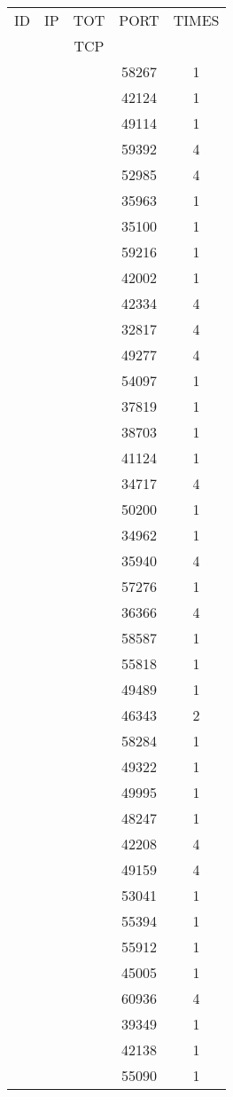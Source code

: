 \documentclass[a4paper]{scrartcl}
\begin{document}
\begin{minipage}[b]{0.5\linewidth}
\begin{tabular}{| c | c | c | c | c |}
\hline
ID & IP & TOT & PORT & TIMES \\ 
   &    & TCP &      &       \\ 
\hline
& & & 58267 & 1 \\ & & & 42124 & 1 \\ & & & 49114 & 1 \\ & & & 59392 & 4 \\ & & & 52985 & 4 \\ & & & 35963 & 1 \\ & & & 35100 & 1 \\ & & & 59216 & 1 \\ & & & 42002 & 1 \\ & & & 42334 & 4 \\ & & & 32817 & 4 \\ & & & 49277 & 4 \\ & & & 54097 & 1 \\ & & & 37819 & 1 \\ & & & 38703 & 1 \\ & & & 41124 & 1 \\ & & & 34717 & 4 \\ & & & 50200 & 1 \\ & & & 34962 & 1 \\ & & & 35940 & 4 \\ & & & 57276 & 1 \\ & & & 36366 & 4 \\ & & & 58587 & 1 \\ & & & 55818 & 1 \\ & & & 49489 & 1 \\ & & & 46343 & 2 \\ & & & 58284 & 1 \\ & & & 49322 & 1 \\ & & & 49995 & 1 \\ & & & 48247 & 1 \\ & & & 42208 & 4 \\ & & & 49159 & 4 \\ & & & 53041 & 1 \\ & & & 55394 & 1 \\ & & & 55912 & 1 \\ & & & 45005 & 1 \\ & & & 60936 & 4 \\ & & & 39349 & 1 \\ & & & 42138 & 1 \\ & & & 55090 & 1 \\ \hline\end{tabular}\end{minipage} \hfill\begin{minipage}[b]{0.5\linewidth}\begin{tabular}{| c | c | c | c | c |}

\end{tabular}
\end{minipage}
\end{document}
